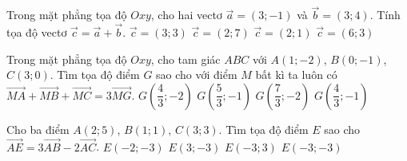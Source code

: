 \begin{ex}%
	Trong mặt phẳng tọa độ $Oxy$, cho hai vectơ $\overrightarrow{a}=(3;-1)$ và $\overrightarrow{b}=(3;4)$. Tính tọa độ vectơ $\overrightarrow{c}=\overrightarrow{a}+\overrightarrow{b}$.
	\choice
	{$\overrightarrow{c}=(3;3)$}
	{$\overrightarrow{c}=(2;7)$}
	{$\overrightarrow{c}=(2;1)$}
	{\True $\overrightarrow{c}=(6;3)$}
\end{ex}
\begin{ex}%
	Trong mặt phẳng tọa độ $Oxy$, cho tam giác $ABC$ với $A(1;-2)$, $B(0;-1)$, $C(3;0)$. Tìm tọa độ điểm $G$ sao cho với điểm $M$ bất kì ta luôn có $\overrightarrow{MA}+\overrightarrow{MB}+\overrightarrow{MC}=3\overrightarrow{MG}$.
	\choice
	{$G\left(\dfrac{4}{3};-2\right)$}
	{$G\left(\dfrac{5}{3};-1\right)$}
	{$G\left(\dfrac{7}{3};-2\right)$}
	{\True $G\left(\dfrac{4}{3};-1\right)$}
\end{ex}
\begin{ex}%
	Cho ba điểm $A(2;5)$, $B(1;1)$, $C(3;3)$. Tìm tọa độ điểm $E$ sao cho $\overrightarrow{AE} = 3\overrightarrow{AB} - 2\overrightarrow{AC}$.
	\choice
	{$E(-2;-3)$}
	{$E(3;-3)$}
	{$E(-3;3)$}
	{\True $E(-3;-3)$}
\end{ex}
